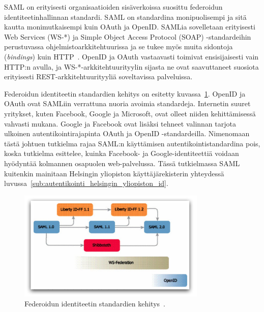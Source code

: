 \documentclass[finnish,gradu]{tktltiki}
\begin{document}
  SAML on erityisesti organisaatioiden sisäverkoissa suosittu federoidun identiteetinhallinnan standardi. SAML on standardina monipuolisempi ja sitä kautta monimutkaisempi kuin OAuth ja OpenID.
  SAMLia sovelletaan erityisesti Web Services (WS-*) ja Simple Object Access Protocol (SOAP) -standardeihin perustuvassa ohjelmistoarkkitehtuurissa ja se tukee myös muita sidontoja (\emph{bindings}) kuin HTTP~\cite{venn_of_identity_2008}. OpenID ja OAuth vastaavasti toimivat ensisijaisesti vain HTTP:n avulla, ja WS-*-arkkitehtuurityylin sijasta ne ovat saavuttaneet suosiota erityisesti REST-arkkitehtuurityyliä soveltavissa palveluissa.

  Federoidun identiteetin standardien kehitys on esitetty kuvassa~\ref{fig:federoidun_id_standardien_kehitys}. OpenID ja OAuth ovat SAMLiin verrattuna nuoria avoimia standardeja. Internetin suuret yritykset, kuten Facebook, Google ja Microsoft, ovat olleet niiden kehittämisessä vahvasti mukana. Google ja Facebook ovat lisäksi tehneet valinnan tarjota ulkoinen autentikointirajapinta OAuth ja OpenID -standardeilla. Nimenomaan tästä johtuen tutkielma rajaa SAML:n käyttämisen autentikointistandardina pois, koska tutkielma esittelee, kuinka Facebook- ja Google-identiteettiä voidaan hyödyntää kolmannen osapuolen web-palvelussa. Tässä tutkielmassa SAML kuitenkin mainitaan Helsingin yliopiston käyttäjärekisterin yhteydessä luvussa~\ref{sub:autentikointi_helsingin_yliopiston_id}.

  \begin{figure}
    \centering
    \includegraphics[width=0.8\textwidth]{images/federoidun_id_standardien_kehitys.jpg}
    \caption{Federoidun identiteetin standardien kehitys~\cite{ping_identity_primer_federated_id_2010}.}
    \label{fig:federoidun_id_standardien_kehitys}
  \end{figure}


\end{document}
